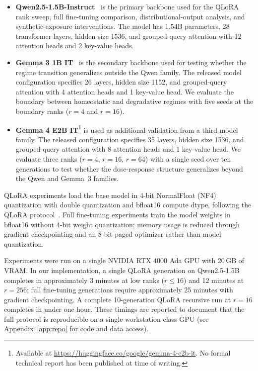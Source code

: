 \documentclass[a4paper,fleqn]{cas-dc}
\begin{document}
\begin{itemize}
    \item \textbf{Qwen2.5-1.5B-Instruct}~\citep{qwen2024} is the primary
    backbone used for the QLoRA rank sweep, full fine-tuning comparison,
    distributional-output analysis, and synthetic-exposure interventions. The
    model has 1.54B parameters, 28 transformer layers, hidden size 1536, and
    grouped-query attention with 12 attention heads and 2 key-value heads.

    \item \textbf{Gemma 3 1B IT}~\citep{gemma2025} is the secondary backbone
    used for testing whether the regime transition generalizes outside the Qwen
    family. The released model configuration specifies 26 layers, hidden size
    1152, and grouped-query attention with 4 attention heads and 1 key-value
    head. We evaluate the boundary between homeostatic and degradative regimes
    with five seeds at the boundary ranks ($r=4$ and $r=16$).

    \item \textbf{Gemma 4 E2B IT}\footnote{Available at
    \url{https://huggingface.co/google/gemma-4-e2b-it}. No formal technical
    report has been published at time of writing.} is used as additional
    validation from a third model family. The released configuration specifies
    35 layers, hidden size 1536, and grouped-query attention with 8 attention
    heads and 1 key-value head. We evaluate three ranks ($r=4$,
    $r=16$, $r=64$) with a single seed over ten generations to test whether
    the dose-response structure generalizes beyond the Qwen and Gemma~3
    families.
\end{itemize}

QLoRA experiments load the base model in 4-bit
NormalFloat (NF4) quantization with double quantization and bfloat16 compute
dtype, following the QLoRA protocol~\citep{dettmers2023}. Full fine-tuning
experiments train the model weights in bfloat16 without 4-bit weight
quantization; memory usage is reduced through gradient checkpointing and an
8-bit paged optimizer rather than model quantization.

Experiments were run on a single NVIDIA RTX 4000 Ada GPU with 20\,GB of VRAM.
In our implementation, a single QLoRA generation on Qwen2.5-1.5B completes in
approximately 3 minutes at low ranks ($r \leq 16$) and 12 minutes at $r=256$; full
fine-tuning generations require approximately 25 minutes with gradient
checkpointing. A complete 10-generation QLoRA recursive run at $r=16$ completes
in under one hour. These timings are reported to document that the full protocol
is reproducible on a single workstation-class GPU (see Appendix~\ref{app:repo}
for code and data access).
\end{document}
